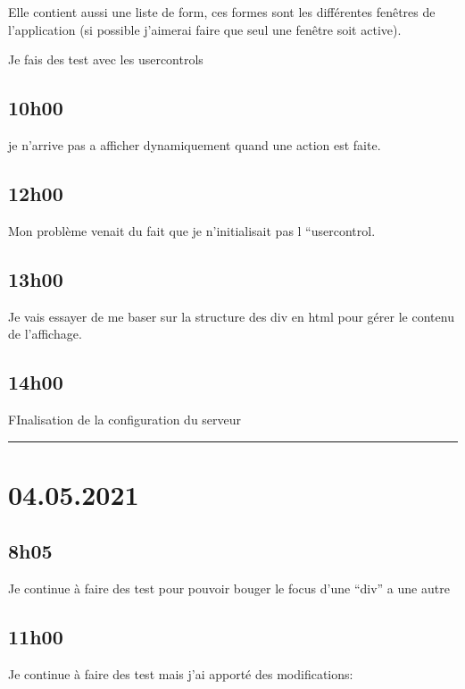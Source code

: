 \documentclass[a4paper,12pt,french]{sphinxmanual}
\begin{document}
\sphinxAtStartPar
Elle contient aussi une liste de form, ces formes sont les différentes fenêtres de l’application (si possible j’aimerai faire que seul une fenêtre soit active).

\sphinxAtStartPar
Je fais des test avec les usercontrols


\subsection{10h00}
\label{\detokenize{logbook:id62}}
\sphinxAtStartPar
je n’arrive pas a afficher dynamiquement quand une action est faite.


\subsection{12h00}
\label{\detokenize{logbook:id63}}
\sphinxAtStartPar
Mon problème venait du fait que je n’initialisait pas l “usercontrol.


\subsection{13h00}
\label{\detokenize{logbook:id64}}
\sphinxAtStartPar
Je vais essayer de me baser sur la structure des div en html pour gérer le contenu de l’affichage.


\subsection{14h00}
\label{\detokenize{logbook:id65}}
\sphinxAtStartPar
FInalisation de la configuration du serveur


\bigskip\hrule\bigskip



\section{04.05.2021}
\label{\detokenize{logbook:id66}}

\subsection{8h05}
\label{\detokenize{logbook:id67}}
\sphinxAtStartPar
Je continue à faire des test pour pouvoir bouger le focus d’une “div” a une autre


\subsection{11h00}
\label{\detokenize{logbook:id68}}
\sphinxAtStartPar
Je continue à faire des test mais j’ai apporté des modifications:
\end{document}
